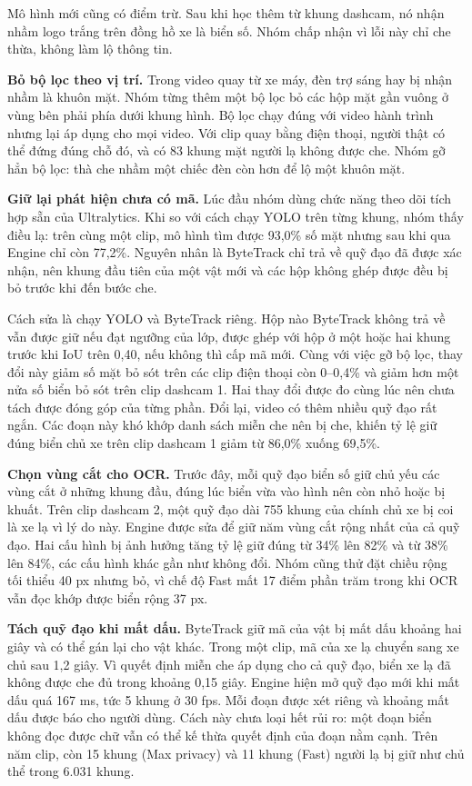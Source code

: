 Mô hình mới cũng có điểm trừ. Sau khi học thêm từ khung dashcam, nó nhận nhầm logo trắng trên đồng hồ xe là biển số. Nhóm chấp nhận vì lỗi này chỉ che thừa, không làm lộ thông tin.

\textbf{Bỏ bộ lọc theo vị trí.} Trong video quay từ xe máy, đèn trợ sáng hay bị nhận nhầm là khuôn mặt. Nhóm từng thêm một bộ lọc bỏ các hộp mặt gần vuông ở vùng bên phải phía dưới khung hình. Bộ lọc chạy đúng với video hành trình nhưng lại áp dụng cho mọi video. Với clip quay bằng điện thoại, người thật có thể đứng đúng chỗ đó, và có 83 khung mặt người lạ không được che. Nhóm gỡ hẳn bộ lọc: thà che nhầm một chiếc đèn còn hơn để lộ một khuôn mặt.

\textbf{Giữ lại phát hiện chưa có mã.} Lúc đầu nhóm dùng chức năng theo dõi tích hợp sẵn của Ultralytics. Khi so với cách chạy YOLO trên từng khung, nhóm thấy điều lạ: trên cùng một clip, mô hình tìm được 93,0\% số mặt nhưng sau khi qua Engine chỉ còn 77,2\%. Nguyên nhân là ByteTrack chỉ trả về quỹ đạo đã được xác nhận, nên khung đầu tiên của một vật mới và các hộp không ghép được đều bị bỏ trước khi đến bước che.

Cách sửa là chạy YOLO và ByteTrack riêng. Hộp nào ByteTrack không trả về vẫn được giữ nếu đạt ngưỡng của lớp, được ghép với hộp ở một hoặc hai khung trước khi IoU trên 0,40, nếu không thì cấp mã mới. Cùng với việc gỡ bộ lọc, thay đổi này giảm số mặt bỏ sót trên các clip điện thoại còn 0--0,4\% và giảm hơn một nửa số biển bỏ sót trên clip dashcam 1. Hai thay đổi được đo cùng lúc nên chưa tách được đóng góp của từng phần. Đổi lại, video có thêm nhiều quỹ đạo rất ngắn. Các đoạn này khó khớp danh sách miễn che nên bị che, khiến tỷ lệ giữ đúng biển chủ xe trên clip dashcam 1 giảm từ 86,0\% xuống 69,5\%.

\textbf{Chọn vùng cắt cho OCR.} Trước đây, mỗi quỹ đạo biển số giữ chủ yếu các vùng cắt ở những khung đầu, đúng lúc biển vừa vào hình nên còn nhỏ hoặc bị khuất. Trên clip dashcam 2, một quỹ đạo dài 755 khung của chính chủ xe bị coi là xe lạ vì lý do này. Engine được sửa để giữ năm vùng cắt rộng nhất của cả quỹ đạo. Hai cấu hình bị ảnh hưởng tăng tỷ lệ giữ đúng từ 34\% lên 82\% và từ 38\% lên 84\%, các cấu hình khác gần như không đổi. Nhóm cũng thử đặt chiều rộng tối thiểu 40 px nhưng bỏ, vì chế độ Fast mất 17 điểm phần trăm trong khi OCR vẫn đọc khớp được biển rộng 37 px.

\textbf{Tách quỹ đạo khi mất dấu.} ByteTrack giữ mã của vật bị mất dấu khoảng hai giây và có thể gán lại cho vật khác. Trong một clip, mã của xe lạ chuyển sang xe chủ sau 1,2 giây. Vì quyết định miễn che áp dụng cho cả quỹ đạo, biển xe lạ đã không được che đủ trong khoảng 0,15 giây. Engine hiện mở quỹ đạo mới khi mất dấu quá 167 ms, tức 5 khung ở 30 fps. Mỗi đoạn được xét riêng và khoảng mất dấu được báo cho người dùng. Cách này chưa loại hết rủi ro: một đoạn biển không đọc được chữ vẫn có thể kế thừa quyết định của đoạn nằm cạnh. Trên năm clip, còn 15 khung (Max privacy) và 11 khung (Fast) người lạ bị giữ như chủ thể trong 6.031 khung.

